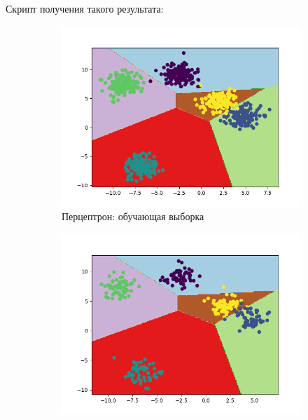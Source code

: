 Скрипт получения такого результата:

\noindent{}

\begin{figure}[h]
	\centering
	\begin{subfigure}{0.49\linewidth}
		\includegraphics[width=\linewidth]{images/perceptron_train_blobs_last}
		\caption{Перцептрон: обучающая выборка}
	\end{subfigure}
	\begin{subfigure}{0.49\linewidth}
		\includegraphics[width=\linewidth]{images/perceptron_test_blobs_last}

\end{subfigure}
\end{figure}
